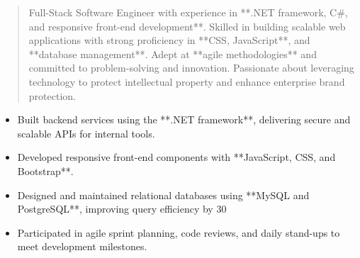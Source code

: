 



\makecvheader

\begin{quote}
  \noindent
  Full-Stack Software Engineer with experience in **.NET framework, C#, and responsive front-end development**. Skilled in building scalable web applications with strong proficiency in **CSS, JavaScript**, and **database management**. Adept at **agile methodologies** and committed to problem-solving and innovation. Passionate about leveraging technology to protect intellectual property and enhance enterprise brand protection.
\end{quote}

\par\smallskip
\noindent
\begin{minipage}{20cm}
  \begin{minipage}{9.75cm}
    \begin{itemize}
      \item Built backend services using the **.NET framework**, delivering secure and scalable APIs for internal tools.
      \item Developed responsive front-end components with **JavaScript, CSS, and Bootstrap**.
    \end{itemize}
  \end{minipage}
  \hfill
  \begin{minipage}{9.75cm}
    \begin{itemize}
      \item Designed and maintained relational databases using **MySQL and PostgreSQL**, improving query efficiency by 30%
      \item Participated in agile sprint planning, code reviews, and daily stand-ups to meet development milestones.
    \end{itemize}
  \end{minipage}
\end{minipage}
\par\smallskip
\divider

